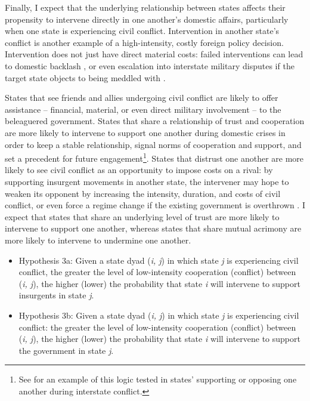 \documentclass[10pt,]{article}
\begin{document}
Finally, I expect that the underlying relationship between states
affects their propensity to intervene directly in one another's domestic
affairs, particularly when one state is experiencing civil conflict.
Intervention in another state's conflict is another example of a
high-intensity, costly foreign policy decision. Intervention does not
just have direct material costs: failed interventions can lead to
domestic backlash \citep[51]{Aydin2010}, or even escalation into
interstate military disputes if the target state objects to being
meddled with \citep[480-482]{Gleditsch2008}.

States that see friends and allies undergoing civil conflict are likely
to offer assistance -- financial, material, or even direct military
involvement -- to the beleaguered government. States that share a
relationship of trust and cooperation are more likely to intervene to
support one another during domestic crises in order to keep a stable
relationship, signal norms of cooperation and support, and set a
precedent for future engagement\footnote{See \citep{Corbetta2013} for an
  example of this logic tested in states' supporting or opposing one
  another during interstate conflict.}. States that distrust one another
are more likely to see civil conflict as an opportunity to impose costs
on a rival: by supporting insurgent movements in another state, the
intervener may hope to weaken its opponent by increasing the intensity,
duration, and costs of civil conflict, or even force a regime change if
the existing government is overthrown
\citetext{\citealp[349-351]{BalchLindsay2008}; \citealp[128]{Lounsbery2016}}.
I expect that states that share an underlying level of trust are more
likely to intervene to support one another, whereas states that share
mutual acrimony are more likely to intervene to undermine one another.

\begin{itemize}
\item
  Hypothesis 3a: Given a state dyad (\emph{i, j}) in which state
  \emph{j} is experiencing civil conflict, the greater the level of
  low-intensity cooperation (conflict) between (\emph{i, j}), the higher
  (lower) the probability that state \emph{i} will intervene to support
  insurgents in state \emph{j}.
\item
  Hypothesis 3b: Given a state dyad (\emph{i, j}) in which state
  \emph{j} is experiencing civil conflict: the greater the level of
  low-intensity cooperation (conflict) between (\emph{i, j}), the higher
  (lower) the probability that state \emph{i} will intervene to support
  the government in state \emph{j}.
\end{itemize}
\end{document}
